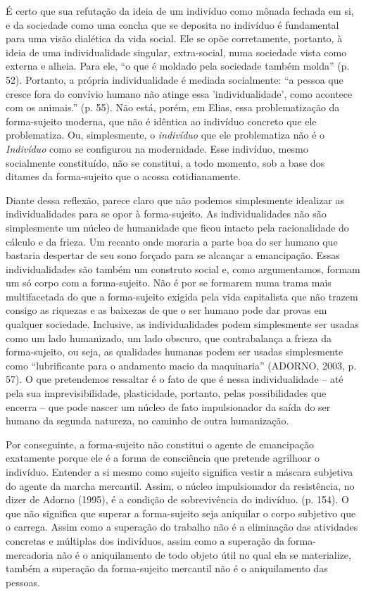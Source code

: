 É certo que sua refutação da ideia de um indivíduo como mônada fechada
em si, e da sociedade como uma concha que se deposita no indivíduo é
fundamental para uma visão dialética da vida social. Ele se opõe
corretamente, portanto, à ideia de uma individualidade singular,
extra-social, numa sociedade vista como externa e alheia. Para ele, ``o
que é moldado pela sociedade também molda'' (p. 52). Portanto, a própria
individualidade é mediada socialmente: ``a pessoa que cresce fora do
convívio humano não atinge essa 'individualidade', como acontece com os
animais.'' (p. 55). Não está, porém, em Elias, essa problematização da
forma-sujeito moderna, que não é idêntica ao indivíduo concreto que ele
problematiza. Ou, simplesmente, o \emph{indivíduo} que ele problematiza
não é o \emph{Indivíduo} como se configurou na modernidade. Esse
indivíduo, mesmo socialmente constituído, não se constitui, a todo
momento, sob a base dos ditames da forma-sujeito que o acossa
cotidianamente.

Diante dessa reflexão, parece claro que não podemos simplesmente
idealizar as individualidades para se opor à forma-sujeito. As
individualidades não são simplesmente um núcleo de humanidade que ficou
intacto pela racionalidade do cálculo e da frieza. Um recanto onde
moraria a parte boa do ser humano que bastaria despertar de seu sono
forçado para se alcançar a emancipação. Essas individualidades são
também um construto social e, como argumentamos, formam um só corpo com
a forma-sujeito. Não é por se formarem numa trama mais multifacetada do
que a forma-sujeito exigida pela vida capitalista que não trazem consigo
as riquezas e as baixezas de que o ser humano pode dar provas em
qualquer sociedade. Inclusive, as individualidades podem simplesmente
ser usadas como um lado humanizado, um lado obscuro, que contrabalança a
frieza da forma-sujeito, ou seja, as qualidades humanas podem ser usadas
simplesmente como ``lubrificante para o andamento macio da maquinaria''
(ADORNO, 2003, p. 57). O que pretendemos ressaltar é o fato de que é
nessa individualidade -- até pela sua imprevisibilidade, plasticidade,
portanto, pelas possibilidades que encerra -- que pode nascer um núcleo
de fato impulsionador da saída do ser humano da segunda natureza, no
caminho de outra humanização.

Por conseguinte, a forma-sujeito não constitui o agente de emancipação
exatamente porque ele é a forma de consciência que pretende agrilhoar o
indivíduo. Entender a si mesmo como sujeito significa vestir a máscara
subjetiva do agente da marcha mercantil. Assim, o núcleo impulsionador
da resistência, no dizer de Adorno (1995), é a condição de sobrevivência
do indivíduo. (p. 154). O que não significa que superar a forma-sujeito
seja aniquilar o corpo subjetivo que o carrega. Assim como a superação
do trabalho não é a eliminação das atividades concretas e múltiplas dos
indivíduos, assim como a superação da forma-mercadoria não é o
aniquilamento de todo objeto útil no qual ela se materialize, também a
superação da forma-sujeito mercantil não é o aniquilamento das pessoas.

